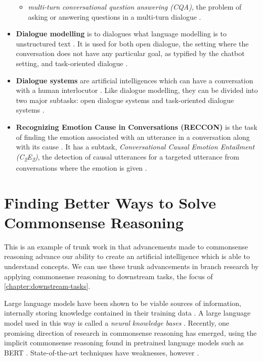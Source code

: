 \documentclass[12pt]{report}
\begin{document}
\begin{itemize}[nolistsep]
\begin{itemize}[nolistsep]
            \item \textit{multi-turn conversational question answering (CQA)}, the problem of asking or answering questions in a multi-turn dialogue \cite{Richardson2023-mq}.
        \end{itemize}
    \item
        \textbf{Dialogue modelling} is to dialogues what language modelling is to unstructured text \cite{Richardson2023-mq}.
        It is used for both open dialogue, the setting where the conversation does not have any particular goal, as typified by the chatbot setting, and task-oriented dialogue \cite{Richardson2023-mq}.
    \item
        \textbf{Dialogue systems} are artificial intelligences which can have a conversation with a human interlocutor \cite{Ni2023-jk}.
        Like dialogue modelling, they can be divided into two major subtasks: open dialogue systems and task-oriented dialogue systems \cite{Ni2023-jk,Richardson2023-mq}.
    \item
        \textbf{Recognizing Emotion Cause in Conversations (RECCON)} is the task of finding the emotion associated with an utterance in a conversation along with its cause \cite{Poria2020-xk}.
        It has a subtask, \textit{Conversational Causal Emotion Entailment (C\textsubscript{2}E\textsubscript{2})}, the detection of causal utterances for a targeted utterance from conversations where the emotion is given \cite{Li2022-jr}.
\end{itemize}

\chapter{Finding Better Ways to Solve Commonsense Reasoning}
\label{chapter:commonsense-reasoning}

This is an example of trunk work in that advancements made to commonsense reasoning advance our ability to create an artificial intelligence which is able to understand concepts.
We can use these trunk advancements in branch research by applying commonsense reasoning to downstream tasks, the focus of \cref{chapter:downstream-tasks}.

Large language models have been shown to be viable sources of information, internally storing knowledge contained in their training data \cite{Petroni2019-uz,Feldman2019-gc,Bouraoui2020-fw}.
A large language model used in this way is called a \textit{neural knowledge bases} \cite{Lin2020-ik}.
Recently, one promising direction of research in commonsense reasoning has emerged, using the implicit commonsense reasoning found in pretrained language models \cite{Zhou2020-wi,Trinh2018-pm,Rajani2019-zk} such as BERT \cite{Lin2020-ik,Devlin2018-om}.
State-of-the-art techniques have weaknesses, however \cite{Bian2023-rj,Lin2020-ik}.
\end{document}
